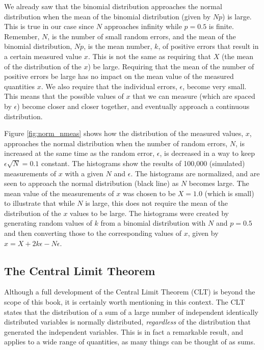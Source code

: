 We already saw that the binomial distribution approaches the normal distribution when the mean of the binomial distribution (given by $Np$) is large. This is true in our case since $N$ approaches infinity while $p=0.5$ is finite. Remember, $N$, is the number of small random errors, and the mean of the binomial distribution, $Np$, is the mean number, $k$, of positive errors that result in a certain measured value $x$. This is not the same as requiring that $X$ (the mean of the distribution of the $x$) be large. Requiring that the mean of the number of positive errors be large has no impact on the mean value of the measured quantities $x$. We also require that the individual errors, $\epsilon$, become very small. This means that the possible values of $x$ that we can measure (which are spaced by $\epsilon$) become closer and closer together, and eventually approach a continuous distribution. 

Figure \ref{fig:norm_nmeas} shows how the distribution of the measured values, $x$, approaches the normal distribution when the number of random errors, $N$, is increased at the same time as the random error, $\epsilon$, is decreased in a way to keep $\epsilon\sqrt{N}=0.1$ constant. The histograms show the results of 100,000 (simulated) measurements of $x$ with a given $N$ and $\epsilon$. The histograms are normalized, and are seen to approach the normal distribution (black line) as $N$ becomes large. The mean value of the measurements of $x$ was chosen to be $X=1.0$ (which is small) to illustrate that while $N$ is large, this does not require the mean of the distribution of the $x$ values to be large. The histograms were created by generating random values of $k$ from a binomial distribution with $N$ and $p=0.5$ and then converting those to the corresponding values of $x$, given by $x=X+2k\epsilon-N\epsilon$.


\subsection{The Central Limit Theorem}
Although a full development of the Central Limit Theorem (CLT) is beyond the scope of this book, it is certainly worth mentioning in this context. The CLT states that the distribution of a sum of a large number of independent identically distributed variables is normally distributed, \textit{regardless} of the distribution that generated the independent variables. This is in fact a remarkable result, and applies to a wide range of quantities, as many things can be thought of as sums.

